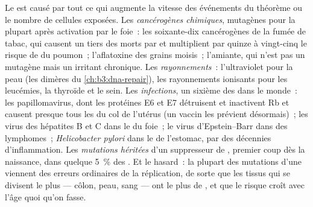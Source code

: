 \begin{proposition}\label{prop:b3:cancer-biology:causes}
Le  est causé par tout ce qui augmente la vitesse des événements
du théorème ou le nombre de cellules exposées. Les \emph{cancérogènes
chimiques}, mutagènes pour la plupart après activation par le foie~:
les soixante-dix cancérogènes de la fumée de tabac, qui causent un
tiers des morts par  et multiplient par quinze à vingt-cinq le
risque de  du poumon~; l'aflatoxine des grains moisis~;
l'amiante, qui n'est pas un mutagène mais un irritant chronique. Les
\emph{rayonnements}~: l'ultraviolet pour la peau (les dimères du
\cref{ch:b3:dna-repair}), les rayonnements ionisants pour les leucémies,
la thyroïde et le sein. Les \emph{infections}, un sixième des 
dans le monde~: les papillomavirus, dont les protéines E6 et E7
détruisent  et inactivent Rb et causent presque tous les  du
col de l'utérus (un vaccin les prévient désormais)~; les virus des
hépatites B et C dans le  du foie~; le virus d'Epstein--Barr dans
des lymphomes~; \emph{Helicobacter pylori} dans le  de l'estomac,
par des décennies d'inflammation. Les \emph{mutations héritées} d'un
suppresseur de , premier coup dès la naissance, dans quelque
\qty{5}{\%} des . Et le hasard~: la plupart des mutations d'une
 viennent des erreurs ordinaires de la réplication, de sorte que
les tissus qui se divisent le plus --- côlon, peau, sang --- ont le
plus de , et que le risque croît avec l'âge quoi qu'on fasse.
\end{proposition}

